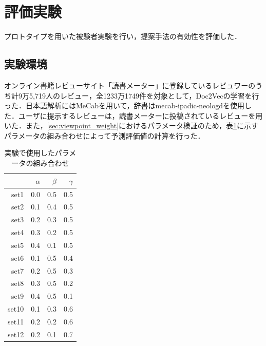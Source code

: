 \documentclass[a4paper,11pt,oneside,openany]{jsbook}
\begin{document}
	\section{評価実験}
プロトタイプを用いた被験者実験を行い，提案手法の有効性を評価した．
		\subsection{実験環境}
		
オンライン書籍レビューサイト「読書メーター」\cite{bookmeter}に登録しているレビュワーのうち計9万5,719人のレビュー，全1233万1749件を対象として，Doc2Vecの学習を行った．日本語解析にはMeCabを用いて，辞書はmecab-ipadic-neologd\cite{mecabdic}を使用した．ユーザに提示するレビューは，読書メーターに投稿されているレビューを用いた．また，\ref{sec:viewpoint_weight}におけるパラメータ検証のため，表\ref{table:parameter}に示すパラメータの組み合わせによって予測評価値の計算を行った．
\begin{table}[tb]
  \begin{center}
    \caption{実験で使用したパラメータの組み合わせ}
    \label{table:parameter} %
    \begin{tabular}{| r || r | r | r |} \hline
       & $\alpha$ & $\beta$ & $\gamma$ \\ \hline \hline
      set1 & 0.0 & 0.5 & 0.5 \\ \hline
      set2 & 0.1 & 0.4 & 0.5 \\ \hline
      set3 & 0.2 & 0.3 & 0.5 \\ \hline
      set4 & 0.3 & 0.2 & 0.5 \\ \hline
      set5 & 0.4 & 0.1 & 0.5 \\ \hline
      set6 & 0.1 & 0.5 & 0.4 \\ \hline
      set7 & 0.2 & 0.5 & 0.3 \\ \hline
      set8 & 0.3 & 0.5 & 0.2 \\ \hline
      set9 & 0.4 & 0.5 & 0.1 \\ \hline
      set10 & 0.1 & 0.3 & 0.6 \\ \hline
      set11 & 0.2 & 0.2& 0.6 \\ \hline
      set12 & 0.2 & 0.1& 0.7 \\ \hline
    \end{tabular}
  \end{center}
\end{table}
\end{document}
